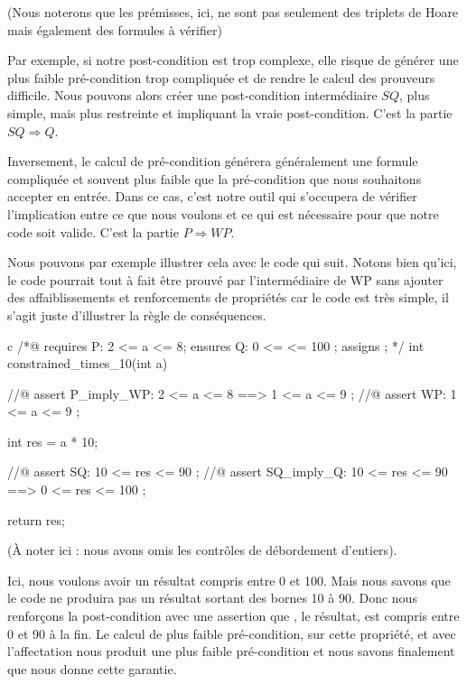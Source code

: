 \documentclass[middle]{zmdocument}
\begin{document}
(Nous noterons que les prémisses, ici, ne sont pas seulement des triplets de
Hoare mais également des formules à vérifier)



Par exemple, si notre post-condition est trop complexe, elle risque de générer
une plus faible pré-condition trop compliquée et de rendre le calcul des 
prouveurs difficile. Nous pouvons alors créer une post-condition intermédiaire
$SQ$, plus simple, mais plus restreinte et impliquant la vraie post-condition. 
C'est la partie $SQ \Rightarrow Q$.



Inversement, le calcul de pré-condition générera généralement une formule 
compliquée et souvent plus faible que la pré-condition que nous souhaitons
accepter en entrée. Dans ce cas, c'est notre outil qui s'occupera de vérifier 
l'implication entre ce que nous voulons et ce qui est nécessaire pour que notre
code soit valide. C'est la partie $P \Rightarrow WP$.



Nous pouvons par exemple illustrer cela avec le code qui suit. Notons bien qu'ici,
le code pourrait tout à fait être prouvé par l'intermédiaire de WP sans ajouter des
affaiblissements et renforcements de propriétés car le code est très simple, il 
s'agit juste d'illustrer la règle de conséquences.



\begin{CodeBlock}{c}
/*@
  requires P: 2 <= a <= 8;
  ensures  Q: 0 <= \result <= 100 ;
  assigns  \nothing ;
*/
int constrained_times_10(int a){
  //@ assert P_imply_WP: 2 <= a <= 8 ==> 1 <= a <= 9 ;
  //@ assert WP:         1 <= a <= 9 ;

  int res = a * 10;

  //@ assert SQ:         10 <= res <= 90 ;
  //@ assert SQ_imply_Q: 10 <= res <= 90 ==> 0 <= res <= 100 ;

  return res;
}
\end{CodeBlock}



(À noter ici : nous avons omis les contrôles de débordement d'entiers).



Ici, nous voulons avoir un résultat compris entre 0 et 100. Mais nous savons que
le code ne produira pas un résultat sortant des bornes 10 à 90. Donc nous 
renforçons la post-condition avec une assertion que , le résultat, est compris
entre 0 et 90 à la fin. Le calcul de plus faible pré-condition, sur cette propriété,
et avec l'affectation  nous produit une plus faible pré-condition 
 et nous savons finalement que  nous donne cette garantie.
\end{document}
